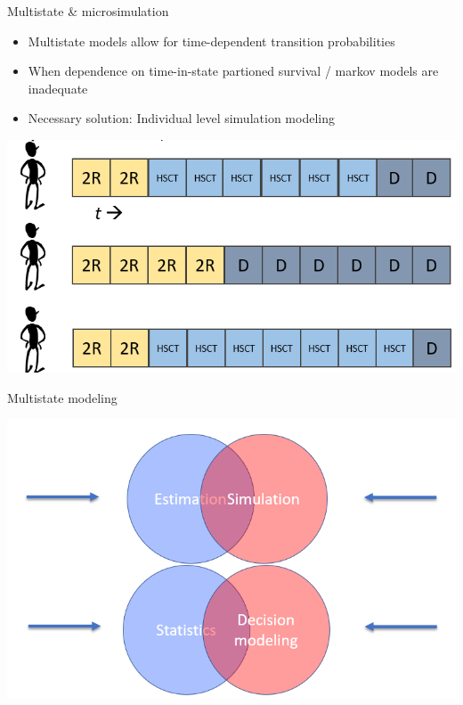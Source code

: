 \documentclass[ignorenonframetext,]{beamer}
\providecommand{\tightlist}{%
  \setlength{\itemsep}{0pt}\setlength{\parskip}{0pt}}
\begin{document}
\begin{frame}{Multistate \& microsimulation}

\begin{itemize}
\tightlist
\item
  Multistate models allow for time-dependent transition probabilities
\item
  When dependence on time-in-state partioned survival / markov models
  are inadequate\\
\item
  Necessary solution: Individual level simulation modeling
\end{itemize}

\includegraphics[width=1\linewidth]{figures/microsim}

\end{frame}

\begin{frame}{Multistate modeling}

\includegraphics[width=1\linewidth]{figures/venn}

\end{frame}
\end{document}
